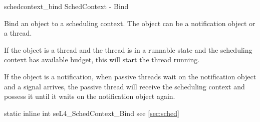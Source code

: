 %
%
%
%

\apidoc
{schedcontext_bind}
{SchedContext - Bind}
{Bind an object to a scheduling context. The object can be a notification object or a thread.
    
    If the object is a thread and the thread is in a runnable state and the scheduling context has available budget, this will start the thread running.
    
    If the object is a notification, when passive threads wait on the notification object and a signal arrives, the passive thread will receive the scheduling context and possess it until it waits on the notification object again.}
{static inline int seL4\_SchedContext\_Bind}
{
}
{\errorenumdesc}
{see \autoref{sec:sched}}
